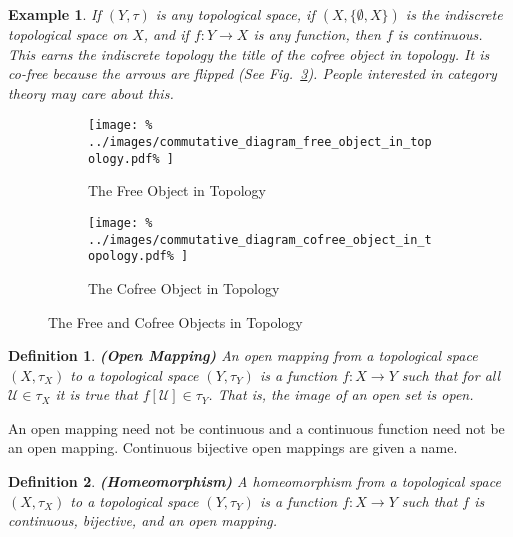 \documentclass{article}
\theoremstyle{plain}
\theoremstyle{normal}
\newtheorem{definition}{Definition}[section]
\newtheorem{example}{Example}[section]
\begin{document}
        \begin{example}
            If $(Y,\tau)$ is any topological space, if $(X,\{\emptyset,X\})$ is
            the indiscrete topological space on $X$, and if $f:Y\rightarrow{X}$
            is any function, then $f$ is continuous. This earns the indiscrete
            topology the title of the \textit{cofree object} in topology. It is
            \textit{co-free} because the arrows are flipped (See
            Fig.~\ref{fig:free_and_cofree_objects_in_topology}).
            People interested in category theory may care about this.
        \end{example}
        \begin{figure}
        	\centering
        	\begin{subfigure}[b]{0.48\textwidth}
                \centering
                \texttt{[image: \%
                    ../images/commutative\_diagram\_free\_object\_in\_topology.pdf\%
                ]}
                \caption{The Free Object in Topology}
                \label{fig:commutative_diagram_free_object_in_topology}
            \end{subfigure}
            \hfill
            \begin{subfigure}[b]{0.49\textwidth}
                \centering
                \texttt{[image: \%
                    ../images/commutative\_diagram\_cofree\_object\_in\_topology.pdf\%
                ]}
                \caption{The Cofree Object in Topology}
                \label{fig:commutative_diagram_cofree_object_in_topology}
            \end{subfigure}
            \caption{The Free and Cofree Objects in Topology}
            \label{fig:free_and_cofree_objects_in_topology}
        \end{figure}
        \begin{definition}{\textbf{(Open Mapping)}}
            An open mapping from a topological space $(X,\tau_{X})$ to a
            topological space $(Y,\tau_{Y})$ is a function $f:X\rightarrow{Y}$
            such that for all $\mathcal{U}\in\tau_{X}$ it is true that
            $f[\mathcal{U}]\in\tau_{Y}$. That is, the image of an open set is
            open.
        \end{definition}
        An open mapping need not be continuous and a continuous function need
        not be an open mapping. Continuous bijective open
        mappings are given a name.
        \begin{definition}{\textbf{(Homeomorphism)}}
            A homeomorphism from a topological space $(X,\tau_{X})$ to a
            topological space $(Y,\tau_{Y})$ is a function $f:X\rightarrow{Y}$
            such that $f$ is continuous, bijective, and an open mapping.
        \end{definition}
\end{document}
